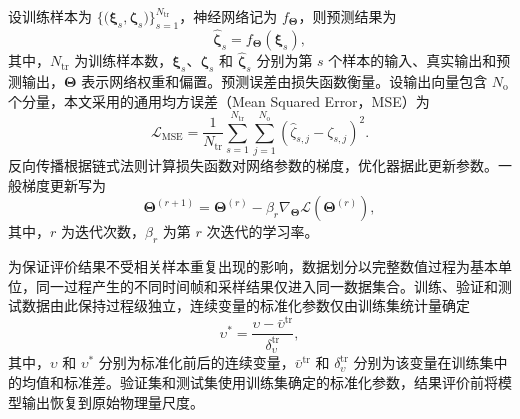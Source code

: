 设训练样本为 $\{\bigl(\boldsymbol{\xi}_s,\boldsymbol{\zeta}_s\bigr)\}_{s=1}^{N_{\mathrm{tr}}}$，神经网络记为 $f_{\boldsymbol{\Theta}}$，则预测结果为
\begin{equation}
\widehat{\boldsymbol{\zeta}}_s
=
f_{\boldsymbol{\Theta}}(\boldsymbol{\xi}_s),
\label{eq:ch2_network_mapping}
\end{equation}
其中，$N_{\mathrm{tr}}$ 为训练样本数，$\boldsymbol{\xi}_s$、$\boldsymbol{\zeta}_s$ 和 $\widehat{\boldsymbol{\zeta}}_s$ 分别为第 $s$ 个样本的输入、真实输出和预测输出，$\boldsymbol{\Theta}$ 表示网络权重和偏置。预测误差由损失函数衡量。设输出向量包含 $N_{\mathrm o}$ 个分量，本文采用的通用均方误差（Mean Squared Error，MSE）为
\begin{equation}
\mathcal{L}_{\mathrm{MSE}}
=
\frac{1}{N_{\mathrm{tr}}}
\sum_{s=1}^{N_{\mathrm{tr}}}
\sum_{j=1}^{N_{\mathrm o}}
\left(
\widehat{\zeta}_{s,j}
-
\zeta_{s,j}
\right)^2.
\label{eq:ch2_mse}
\end{equation}
反向传播根据链式法则计算损失函数对网络参数的梯度，优化器据此更新参数\cite{rumelhart1986backpropagation}。一般梯度更新写为
\begin{equation}
\boldsymbol{\Theta}^{(r+1)}
=
\boldsymbol{\Theta}^{(r)}
-
\beta_r
\nabla_{\boldsymbol{\Theta}}
\mathcal{L}\!\left(\boldsymbol{\Theta}^{(r)}\right),
\label{eq:ch2_parameter_update}
\end{equation}
其中，$r$ 为迭代次数，$\beta_r$ 为第 $r$ 次迭代的学习率。

为保证评价结果不受相关样本重复出现的影响，数据划分以完整数值过程为基本单位，同一过程产生的不同时间帧和采样结果仅进入同一数据集合。训练、验证和测试数据由此保持过程级独立，连续变量的标准化参数仅由训练集统计量确定
\begin{equation}
\upsilon^{\ast}
=
\frac{\upsilon-\bar\upsilon^{\mathrm{tr}}}{\delta_{\upsilon}^{\mathrm{tr}}},
\label{eq:ch2_standardization}
\end{equation}
其中，$\upsilon$ 和 $\upsilon^{\ast}$ 分别为标准化前后的连续变量，$\bar\upsilon^{\mathrm{tr}}$ 和 $\delta_{\upsilon}^{\mathrm{tr}}$ 分别为该变量在训练集中的均值和标准差。验证集和测试集使用训练集确定的标准化参数，结果评价前将模型输出恢复到原始物理量尺度。

